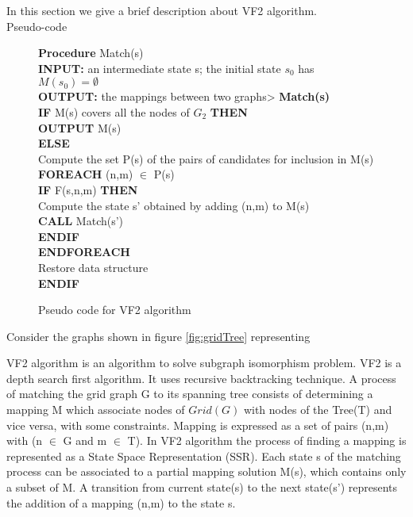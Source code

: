 In this section we give a brief description about VF2 algorithm.\\
Pseudo-code \\
\begin{figure}

\begin{algorithm}[H]
\begin{algorithmic}
 \LState  \textbf{Procedure} Match(s)\\
\textbf{INPUT:}  an intermediate state s; the initial state $s_0$ has $M(s_0)=\emptyset$\\
\textbf{OUTPUT:} the mappings between two graphs>\;
\textbf{Match(s)}\\
 \textbf{IF} M(s) covers all the nodes of $G_2$ \textbf{THEN}\\
               \textbf{OUTPUT} M(s)\\
\textbf{ELSE}\\
                 Compute the set P(s) of the pairs of candidates for inclusion in M(s)\\
\textbf{FOREACH} (n,m) $\in$ P(s)\\
\textbf{IF} F(s,n,m) \textbf{THEN}\\
	Compute the state s' obtained by adding (n,m) to M(s)\\
\textbf{CALL} Match(s')\\
\textbf{ENDIF}\\
\textbf{ENDFOREACH}\\
Restore data structure\\
\textbf{ENDIF}\\

\end{algorithmic}
\end{algorithm}
\caption{Pseudo code for VF2 algorithm}
\label{fig:VF2}
\end{figure}
Consider the graphs shown in figure \ref{fig:gridTree} representing 

VF2 algorithm is an algorithm to solve subgraph isomorphism problem. VF2 is a depth search first algorithm. It uses recursive backtracking technique. A process of matching 
the grid graph G to its spanning tree consists of determining a mapping M which associate nodes of $Grid(G)$ with nodes of the Tree(T) and vice versa, with some constraints.
Mapping is expressed as a set of pairs (n,m) with (n $\in$ G and m $\in$ T). 
In VF2 algorithm the process of finding a mapping is represented as a State Space Representation (SSR). Each state s of the matching process can be associated to a partial mapping solution M(s),
which contains only a subset of M. A transition from current state(s) to the next state(s') represents the addition of a mapping (n,m) to the state s.

